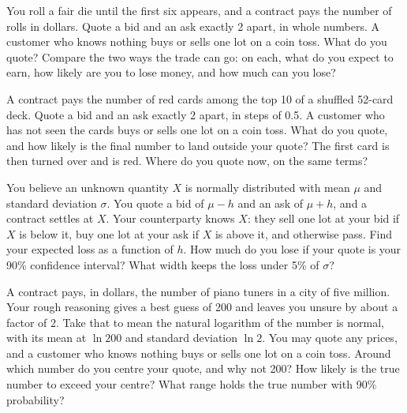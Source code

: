 \begin{question}\label{iq:iv2:making-a-market:8}
You roll a fair die until the first six appears, and a contract pays the number of rolls in dollars. Quote a bid and an ask exactly 2 apart, in whole numbers. A customer who knows nothing buys or sells one lot on a coin toss. What do you quote? Compare the two ways the trade can go: on each, what do you expect to earn, how likely are you to lose money, and how much can you lose?
\end{question}

\begin{question}\label{iq:iv2:making-a-market:9}
A contract pays the number of red cards among the top 10 of a shuffled 52-card deck. Quote a bid and an ask exactly 2 apart, in steps of 0.5. A customer who has not seen the cards buys or sells one lot on a coin toss. What do you quote, and how likely is the final number to land outside your quote? The first card is then turned over and is red. Where do you quote now, on the same terms?
\end{question}

\begin{question}\label{iq:iv2:making-a-market:10}
You believe an unknown quantity $X$ is normally distributed with mean $\mu$ and standard deviation $\sigma$. You quote a bid of $\mu - h$ and an ask of $\mu + h$, and a contract settles at $X$. Your counterparty knows $X$: they sell one lot at your bid if $X$ is below it, buy one lot at your ask if $X$ is above it, and otherwise pass. Find your expected loss as a function of $h$. How much do you lose if your quote is your 90\% confidence interval? What width keeps the loss under 5\% of $\sigma$?
\end{question}

\begin{question}\label{iq:iv2:making-a-market:11}
A contract pays, in dollars, the number of piano tuners in a city of five million. Your rough reasoning gives a best guess of 200 and leaves you unsure by about a factor of 2. Take that to mean the natural logarithm of the number is normal, with its mean at $\ln 200$ and standard deviation $\ln 2$. You may quote any prices, and a customer who knows nothing buys or sells one lot on a coin toss. Around which number do you centre your quote, and why not 200? How likely is the true number to exceed your centre? What range holds the true number with 90\% probability?
\end{question}


